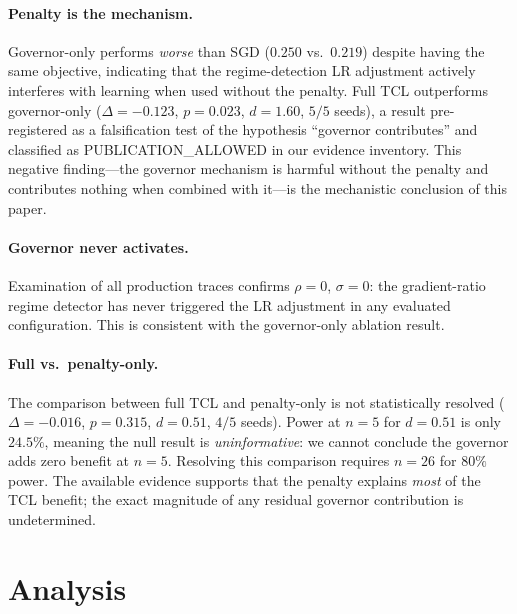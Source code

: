 \documentclass[10pt,letterpaper]{article}
\newcommand{\TCL}{\textsc{TCL}}
\newcommand{\SGD}{\textsc{SGD}}
\begin{document}
\paragraph{Penalty is the mechanism.}
Governor-only performs \emph{worse} than \SGD{} ($0.250$ vs.\ $0.219$)
despite having the same objective, indicating that the regime-detection LR
adjustment actively interferes with learning when used without the penalty.
Full \TCL{} outperforms governor-only ($\Delta{=}{-}0.123$, $p{=}0.023$,
$d{=}1.60$, $5/5$ seeds), a result pre-registered as a falsification test of
the hypothesis ``governor contributes'' and classified as PUBLICATION\_ALLOWED
in our evidence inventory.
This negative finding---the governor mechanism is harmful without the penalty
and contributes nothing when combined with it---is the mechanistic conclusion of
this paper.

\paragraph{Governor never activates.}
Examination of all production traces confirms $\rho{=}0$, $\sigma{=}0$:
the gradient-ratio regime detector has never triggered the LR adjustment
in any evaluated configuration.
This is consistent with the governor-only ablation result.

\paragraph{Full vs.\ penalty-only.}
The comparison between full \TCL{} and penalty-only is not statistically resolved
($\Delta{=}{-}0.016$, $p{=}0.315$, $d{=}0.51$, $4/5$ seeds).
Power at $n{=}5$ for $d{=}0.51$ is only $24.5\%$, meaning the null result
is \emph{uninformative}: we cannot conclude the governor adds zero benefit at
$n{=}5$.
Resolving this comparison requires $n{=}26$ for $80\%$ power.
The available evidence supports that the penalty explains \emph{most} of the
\TCL{} benefit; the exact magnitude of any residual governor contribution
is undetermined.

\section{Analysis}
\label{sec:analysis}
\end{document}
